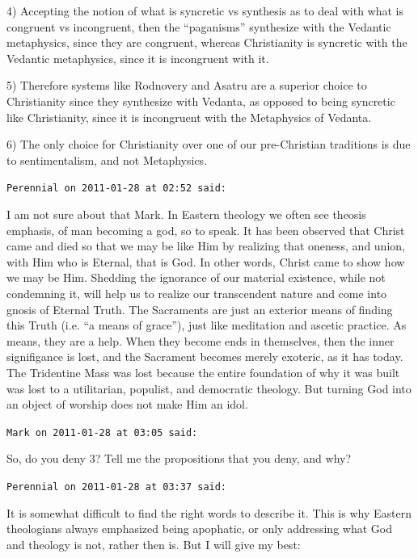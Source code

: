 \begin{footnotesize}
\begin{sffamily}
4) Accepting the notion of what is syncretic vs synthesis as to deal with what is congruent vs incongruent, then the ``paganisms'' synthesize with the Vedantic metaphysics, since they are congruent, whereas Christianity is syncretic with the Vedantic metaphysics, since it is incongruent with it.

5) Therefore systems like Rodnovery and Asatru are a superior choice to Christianity since they synthesize with Vedanta, as opposed to being syncretic like Christianity, since it is incongruent with the Metaphysics of Vedanta.

6) The only choice for Christianity over one of our pre-Christian traditions is due to sentimentalism, and not Metaphysics.

\hfill

\texttt{Perennial on 2011-01-28 at 02:52 said:}

I am not sure about that Mark. In Eastern theology we often see theosis emphasis, of man becoming a god, so to speak. It has been observed that Christ came and died so that we may be like Him by realizing that oneness, and union, with Him who is Eternal, that is God. In other words, Christ came to show how we may be Him. Shedding the ignorance of our material existence, while not condemning it, will help us to realize our transcendent nature and come into gnosis of Eternal Truth. The Sacraments are just an exterior means of finding this Truth (i.e. ``a means of grace''), just like meditation and ascetic practice. As means, they are a help. When they become ends in themselves, then the inner signifigance is lost, and the Sacrament becomes merely exoteric, as it has today. The Tridentine Mass was lost because the entire foundation of why it was built was lost to a utilitarian, populist, and democratic theology. But turning God into an object of worship does not make Him an idol.

\hfill

\texttt{Mark on 2011-01-28 at 03:05 said:}

So, do you deny 3? Tell me the propositions that you deny, and why?

\hfill

\texttt{Perennial on 2011-01-28 at 03:37 said:}

It is somewhat difficult to find the right words to describe it. This is why Eastern theologians always emphasized being apophatic, or only addressing what God and theology is not, rather then is. But I will give my best:


\end{sffamily}
\end{footnotesize}
